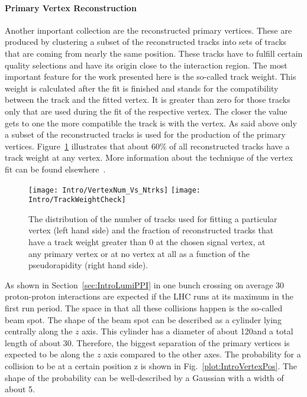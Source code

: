 \paragraph*{Primary Vertex Reconstruction}

Another important collection are the reconstructed primary vertices. These are produced by clustering a subset of the reconstructed tracks into sets of tracks that are coming from nearly the same position. These tracks have to fulfill certain quality selections and have its origin close to the interaction region. The most important feature for the work presented here is the so-called track weight. This weight is calculated after the fit is finished and stands for the compatibility between the track and the fitted vertex. It is greater than zero for those tracks only that are used during the fit of the respective vertex. The closer the value gets to one the more compatible the track is with the vertex. As said above only a subset of the reconstructed tracks is used for the production of the primary vertices. Figure~\ref{plot:IntroTrackWeight} illustrates that about $60\%$ of all reconstructed tracks have a track weight at any vertex.  More information about the technique of the vertex fit can be found elsewhere~\cite{CMS-PAPER-TRK-11-001}.

\begin{figure}[Htb]
    \centering
    \texttt{[image: Intro/VertexNum\_Vs\_Ntrks]}
    \texttt{[image: Intro/TrackWeightCheck]}
    \caption[Distribution of the number of tracks used to fit the primary vertices and fraction of reconstructed tracks that have a track weight at any primary vertex]{The distribution of the number of tracks used for fitting a particular vertex (left hand side) and the fraction of reconstructed tracks that have a track weight greater than 0 at the chosen signal vertex, at any primary vertex or at no vertex at all as a function of the pseudorapidity (right hand side). \label{plot:IntroTrackWeight}}
\end{figure}

As shown in Section~\ref{sec:IntroLumiPPI} in one bunch crossing on average 30 proton-proton interactions are expected if the LHC runs at its maximum in the first run period. The space in that all these collisions happen is the so-called beam spot. The shape of the beam spot can be described as a cylinder lying centrally along the $z$ axis. This cylinder has a diameter of about 120\mum and a total length of about 30\cm. Therefore, the biggest separation of the primary vertices is expected to be along the $z$ axis compared to the other axes. The probability for a collision to be at a certain position z is shown in Fig.~\ref{plot:IntroVertexPos}. The shape of the probability can be well-described by a Gaussian with a width of about 5\cm.

